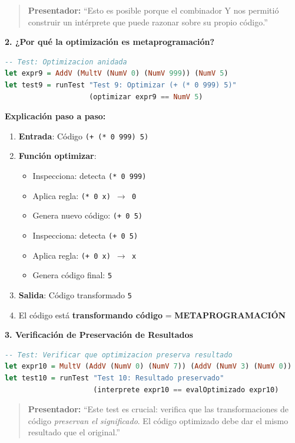 \documentclass[12pt]{article}
\begin{document}
\begin{quote}
\textbf{Presentador:} ``Esto es posible porque el combinador Y nos permitió construir un intérprete que puede razonar sobre su propio código.''
\end{quote}

\textbf{2. ¿Por qué la optimización es metaprogramación?}

\begin{lstlisting}[language=Haskell]
-- Test: Optimizacion anidada
let expr9 = AddV (MultV (NumV 0) (NumV 999)) (NumV 5)
let test9 = runTest "Test 9: Optimizar (+ (* 0 999) 5)"
                    (optimizar expr9 == NumV 5)
\end{lstlisting}

\textbf{Explicación paso a paso:}
\begin{enumerate}
\item \textbf{Entrada}: Código \texttt{(+ (* 0 999) 5)}
\item \textbf{Función optimizar}:
\begin{itemize}
\item Inspecciona: detecta \texttt{(* 0 999)}
\item Aplica regla: \texttt{(* 0 x) $\rightarrow$ 0}
\item Genera nuevo código: \texttt{(+ 0 5)}
\item Inspecciona: detecta \texttt{(+ 0 5)}
\item Aplica regla: \texttt{(+ 0 x) $\rightarrow$ x}
\item Genera código final: \texttt{5}
\end{itemize}
\item \textbf{Salida}: Código transformado \texttt{5}
\item El código está \textbf{transformando código} = \textbf{METAPROGRAMACIÓN}
\end{enumerate}

\textbf{3. Verificación de Preservación de Resultados}

\begin{lstlisting}[language=Haskell]
-- Test: Verificar que optimizacion preserva resultado
let expr10 = MultV (AddV (NumV 0) (NumV 7)) (AddV (NumV 3) (NumV 0))
let test10 = runTest "Test 10: Resultado preservado"
                     (interprete expr10 == evalOptimizado expr10)
\end{lstlisting}

\begin{quote}
\textbf{Presentador:} ``Este test es crucial: verifica que las transformaciones de código \textit{preservan el significado}. El código optimizado debe dar el mismo resultado que el original.''
\end{quote}
\end{document}
